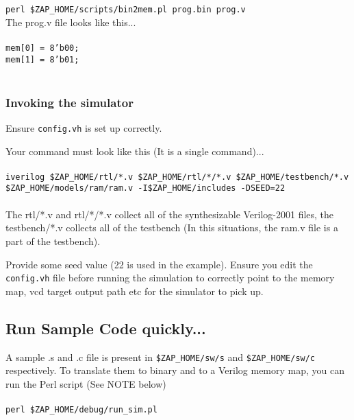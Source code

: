 \documentclass[11pt]{article}
\begin{document}
\texttt{perl \$ZAP\_HOME/scripts/bin2mem.pl prog.bin prog.v}\\
The prog.v file looks like this...\\\\
\texttt{mem[0] = 8'b00;} \\
\texttt{mem[1] = 8'b01;} \\\\


\subsubsection{Invoking the simulator}
Ensure \texttt{config.vh} is set up correctly.

Your command must look like this (It is a single command)...\\\\

\texttt{iverilog  \$ZAP\_HOME/rtl/*.v  \$ZAP\_HOME/rtl/*/*.v 
 \$ZAP\_HOME/testbench/*.v  \$ZAP\_HOME/models/ram/ram.v  
-I\$ZAP\_HOME/includes  -DSEED=22}\\\\

The rtl/*.v and rtl/*/*.v collect all of the synthesizable Verilog-2001 files,
the testbench/*.v collects all of the testbench (In this situations, the ram.v
file is a part of the testbench).

Provide some seed value (22 is used in the example). Ensure you edit the 
\texttt{config.vh} file before running the simulation to correctly point to the
memory map, vcd target output path etc for the simulator to pick up.


\subsection{Run Sample Code quickly...}

A sample .s and .c file is present in \texttt{\$ZAP\_HOME/sw/s} and 
\texttt{\$ZAP\_HOME/sw/c} respectively. To translate them to binary and to a 
Verilog memory map, you can run the Perl script (See NOTE below) \\\\ 

\texttt{perl \$ZAP\_HOME/debug/run\_sim.pl} \\\\ 
\end{document}
